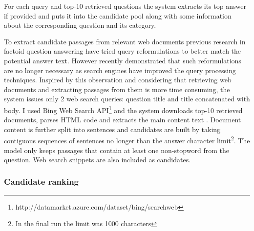 For each query and top-10 retrieved questions the system extracts its top answer if provided and puts it into the candidate pool along with some information about the corresponding question and its category.

To extract candidate passages from relevant web documents previous research in factoid question answering have tried query reformulations \cite{Agichtein:2001:LSE:371920.371976} to better match the potential answer text.
However recently \cite{tsai2015web} demonstrated that such reformulations are no longer necessary as search engines have improved the query processing techniques.
Inspired by this observation and considering that retrieving web documents and extracting passages from them is more time consuming, the system issues only 2 web search queries: question title and title concatenated with body. 
I used Bing Web Search API\footnote{http://datamarket.azure.com/dataset/bing/searchweb} and the system downloads top-10 retrieved documents, parses HTML code and extracts the main content text \cite{Kohlschutter_2010}.
Document content is further split into sentences \cite{manning-EtAl:2014:P14-5} and candidates are built by taking contiguous sequences of sentences no longer than the answer character limit\footnote{In the final run the limit was 1000 characters}.
The model only keeps passages that contain at least one non-stopword from the question.
Web search snippets are also included as candidates.

\subsubsection{Candidate ranking}
\label{section:non-factoid:liveqa:architecture:ranking}

